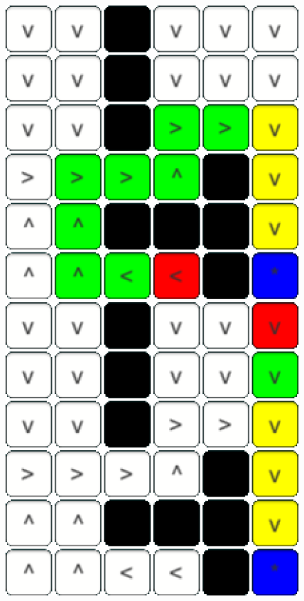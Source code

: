 \documentclass[conference]{IEEEtran}
\begin{document}
\begin{figure}[h]
\centering
\begin{minipage}[t]{0.3\linewidth}
\centering
\includegraphics[width=1\textwidth]{images/OverlappingSubproblems/0.png}
\end{minipage}
\hfill
\begin{minipage}[t]{0.3\linewidth}
\centering
\includegraphics[width=1\textwidth]{images/OverlappingSubproblems/1.png}

\end{minipage}
\end{figure}
\end{document}
